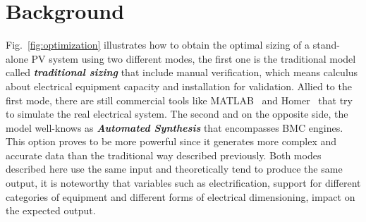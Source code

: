 \documentclass[10pt,journal,compsoc]{IEEEtran}
\begin{document}

\section{Background}
\label{sec:AutomatedVerification}
\vspace{-1ex}  
Fig.~\ref{fig:optimization} illustrates how to obtain the optimal sizing of a stand-alone PV system using two different modes, the first one is the traditional model called \textit{\textbf{traditional sizing}} that include manual verification, which means calculus about electrical equipment capacity and installation for validation. Allied to the first mode, there are still commercial tools like MATLAB~\cite{Benatiallah2017} and Homer~\cite{Pradhan,Swarnkar} that try to simulate the real electrical system. The second and on the opposite side, the model well-knows as \textbf{\textit{Automated Synthesis}} that encompasses BMC engines. This option proves to be more powerful since it generates more complex and accurate data than the traditional way described previously.
Both modes described here use the same input and theoretically tend to produce the same output, it is noteworthy that variables such as electrification, support for different categories of equipment and different forms of electrical dimensioning, impact on the expected output.
\end{document}
